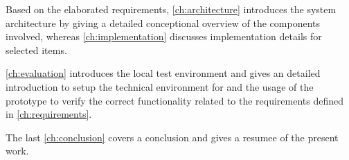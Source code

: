 Based on the elaborated requirements, \autoref{ch:architecture} introduces the system architecture by
giving a detailed conceptional overview of the components involved, whereas \autoref{ch:implementation}
discusses implementation details for selected items.

\autoref{ch:evaluation} introduces the local test environment and gives an detailed introduction to setup
the technical environment for and the usage of the prototype to verify the correct functionality
related to the requirements defined in \autoref{ch:requirements}.

The last \autoref{ch:conclusion} covers a conclusion and gives a resumee of the present work.